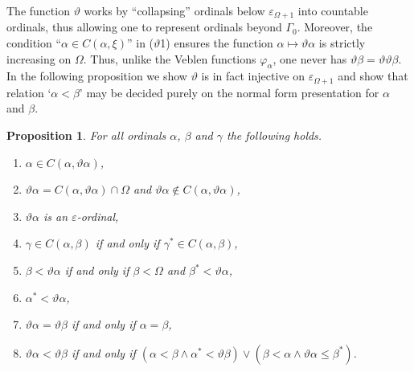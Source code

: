 \documentclass[UKenglish,cleveref,DIV=12]{scrartcl}
\newtheorem{proposition}[lemma]{Proposition}
\theoremstyle{definition}
\theoremstyle{definition}
\begin{document}
The function $\vartheta$ works by ``collapsing'' ordinals below $\varepsilon_{\Omega+1}$ into countable ordinals, thus allowing one to represent ordinals beyond $\Gamma_0$. Moreover, the condition ``$\alpha\in C(\alpha,\xi)$''
in ($\vartheta$1) ensures the function $\alpha\mapsto\vartheta\alpha$ is
strictly increasing on $\Omega$. Thus, unlike the Veblen functions
$\varphi_\alpha$, one never has $\vartheta\beta=\vartheta\vartheta\beta$. In the following proposition we show $\vartheta$ is in fact injective on $\varepsilon_{\Omega+1}$ and show that relation `$\alpha<\beta$' may be decided purely on the normal form presentation for $\alpha$ and $\beta$.
\begin{proposition}\label{prop:thetaitems1} For all ordinals $\alpha$, $\beta$ and $\gamma$ the following holds.
\begin{enumerate}
  \item $\alpha\in C(\alpha,\vartheta\alpha)$,
  \item $\vartheta\alpha=C(\alpha,\vartheta\alpha)\cap\Omega$ and $\vartheta\alpha\not\in C(\alpha,\vartheta\alpha)$,
  \item $\vartheta\alpha$ is an $\varepsilon$-ordinal,
  \item $\gamma\in C(\alpha,\beta)$ if and only if $\gamma^*\in C(\alpha,\beta)$,
  \item $\beta<\vartheta\alpha$ if and only if $\beta<\Omega$ and $\beta^*<\vartheta\alpha$,
  \item $\alpha^*<\vartheta\alpha$,
  \item $\vartheta\alpha=\vartheta\beta$ if and only if $\alpha=\beta$,
  \item $\vartheta\alpha<\vartheta\beta$ if and only if $(\alpha<\beta\land\alpha^*<\vartheta\beta)\lor (\beta<\alpha\land\vartheta\alpha\le\beta^*)$.
\end{enumerate}
\end{proposition}
\end{document}
